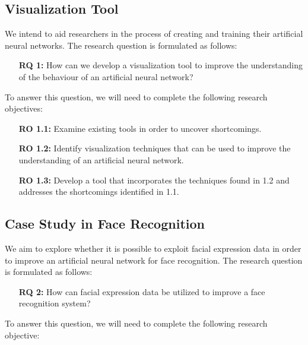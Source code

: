 \subsection{Visualization Tool}

We intend to aid researchers in the process of creating and training their artificial neural networks. The research question is formulated as follows:

\begin{enumerate}[align=left, labelwidth=3.5em, leftmargin=!, itemindent=0em]
    \item[\textbf{RQ 1:}]How can we develop a visualization tool to improve the understanding of the behaviour of an artificial neural network?
\end{enumerate}

\noindent To answer this question, we will need to complete the following research objectives:

\begin{enumerate}[align=left, labelwidth=3.5em, leftmargin=!, itemindent=0em]
    \item[\textbf{RO 1.1:}] Examine existing tools in order to uncover shortcomings.
    \item[\textbf{RO 1.2:}] Identify visualization techniques that can be used to improve the understanding of an artificial neural network.
    \item[\textbf{RO 1.3:}]Develop a tool that incorporates the techniques found in 1.2 and addresses the shortcomings identified in 1.1.
\end{enumerate}

\subsection{Case Study in Face Recognition}

We aim to explore whether it is possible to exploit facial expression data in order to improve an artificial neural network for face recognition. The research question is formulated as follows:

\begin{enumerate}[align=left, labelwidth=3.5em, leftmargin=!, itemindent=0em]
    \item[\textbf{RQ 2:}]How can facial expression data be utilized to improve a face recognition system?
\end{enumerate}

\noindent To answer this question, we will need to complete the following research objective:

